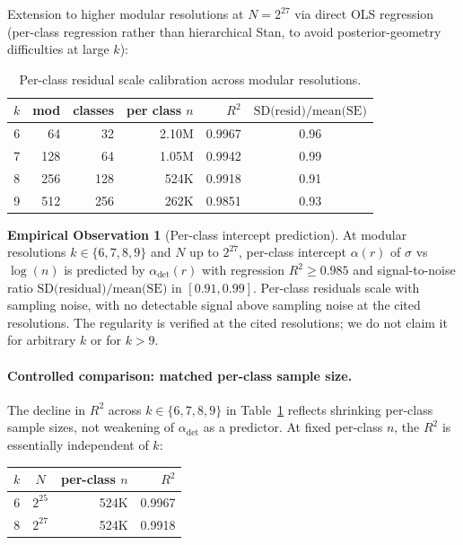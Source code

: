 \documentclass[pdflatex,sn-mathphys-num]{sn-jnl}
\theoremstyle{thmstyleone}%
\theoremstyle{definition}
\newtheorem{observation}[theorem]{Empirical Observation}
\theoremstyle{plain}
\begin{document}
Extension to higher modular resolutions at $N=2^{27}$ via direct OLS regression (per-class regression rather than hierarchical Stan, to avoid posterior-geometry difficulties at large $k$):

\begin{table}[ht]
\centering
\caption{Per-class residual scale calibration across modular resolutions.}
\label{tab:residual-calibration}
\begin{tabular}{rrrrrc}
\toprule
$k$ & mod & classes & per class $n$ & $R^2$ & $\text{SD(resid)} / \text{mean(SE)}$ \\
\midrule
6 & 64 & 32 & 2.10M & 0.9967 & 0.96 \\
7 & 128 & 64 & 1.05M & 0.9942 & 0.99 \\
8 & 256 & 128 & 524K & 0.9918 & 0.91 \\
9 & 512 & 256 & 262K & 0.9851 & 0.93 \\
\bottomrule
\end{tabular}
\end{table}

\begin{observation}[Per-class intercept prediction]
\label{obs:intercept}
At modular resolutions $k \in \{6, 7, 8, 9\}$ and $N$ up to $2^{27}$, per-class intercept $\alpha(r)$ of $\sigma$ vs $\log(n)$ is predicted by $\alpha_{\text{det}}(r)$ with regression $R^2 \geq 0.985$ and signal-to-noise ratio $\text{SD(residual)}/ \text{mean(SE)}$ in $[0.91, 0.99]$. Per-class residuals scale with sampling noise, with no detectable signal above sampling noise at the cited resolutions. The regularity is verified at the cited resolutions; we do not claim it for arbitrary $k$ or for $k > 9$.

\end{observation}

\paragraph{Controlled comparison: matched per-class sample size.}
The decline in $R^2$ across $k \in \{6, 7, 8, 9\}$ in Table~\ref{tab:residual-calibration} reflects shrinking per-class sample sizes, not weakening of $\alpha_{\text{det}}$ as a predictor. At fixed per-class $n$, the $R^2$ is essentially independent of $k$:

\begin{center}
\begin{tabular}{rcrr}
\toprule
 $k$ & $N$ & per-class $n$ & $R^2$ \\
 \midrule
 6 & $2^{25}$ & 524K & 0.9967 \\
 8 & $2^{27}$ & 524K & 0.9918 \\
 \bottomrule
\end{tabular}
\end{center}
\end{document}
